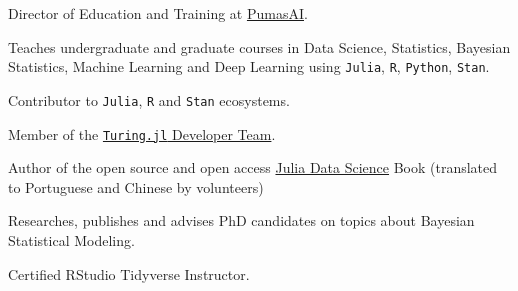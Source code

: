 \vspace{0.25cm}

\begin{cvitems}

  \item Director of Education and Training at \href{https://pumas.ai}{Pumas\-AI}.
	\item Teaches undergraduate and graduate courses in Data Science, Statistics, Bayesian Statistics,
	Machine Learning and Deep Learning using \texttt{Julia}, \texttt{R}, \texttt{Python}, \texttt{Stan}.
	\item Contributor to \texttt{Julia}, \texttt{R} and \texttt{Stan} ecosystems.
	\item Member of the \href{https://turing.ml/dev/team/}{\texttt{Turing.jl} Developer Team}.
	\item Author of the open source and open access \href{https://juliadatascience.io}{Julia Data Science} Book (translated to Portuguese and Chinese by volunteers)
	\item Researches, publishes and advises PhD candidates on topics about Bayesian Statistical Modeling.
	\item Certified RStudio Tidyverse Instructor.

\end{cvitems}

